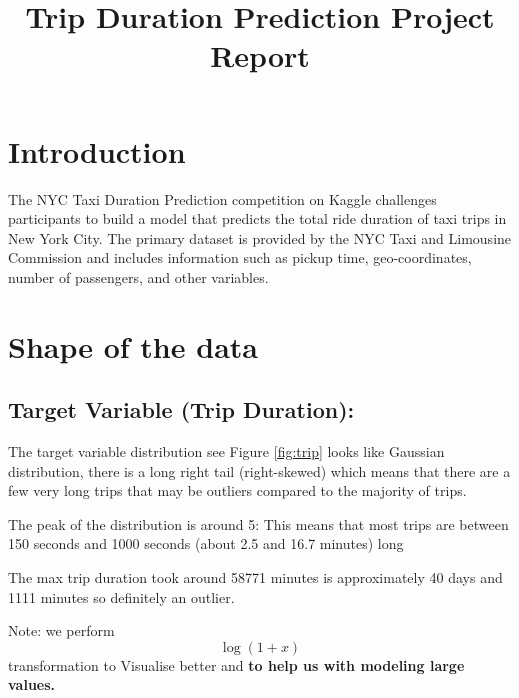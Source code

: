 \documentclass[twocolumn, 9pt]{extarticle}
\begin{document}
\title{Trip Duration Prediction Project Report}



\maketitle

\section{Introduction}

The NYC Taxi Duration Prediction competition on Kaggle challenges participants to build a model that predicts the total ride duration of taxi trips in New York City. The primary dataset is provided by the NYC Taxi and Limousine Commission and includes information such as pickup time, geo-coordinates, number of passengers, and other variables.

\section{Shape of the data}

\subsection{Target Variable (Trip Duration):}

The target variable distribution see Figure  \ref{fig:trip} looks like Gaussian distribution, there is a long right tail (right-skewed) which means that there are a few very long trips that may be outliers compared to the majority of trips.

\hfill \break
The peak of the distribution is around 5: This means that most trips are between 150 seconds and 1000 seconds (about 2.5 and 16.7 minutes) long

\hfill \break
The max trip duration took around 58771 minutes is approximately 40 days and 1111 minutes so definitely an outlier.

\hfill \break
Note: we perform  \[ \log(1 + x) \] transformation to Visualise better and \textbf{to help us with modeling large values.}
\end{document}

